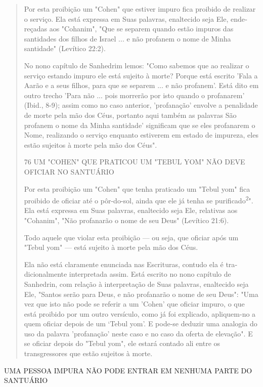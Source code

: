 \begin{quote}
Por esta proibição um "Cohen" que estiver impuro fica proibido de
realizar o serviço. Ela está expressa em Suas palavras, enaltecido seja
Ele, ende­reçadas aos "Cohanim", "Que se separem quando estão impuros
das santida­des dos filhos de Israel ... e não profanem o nome de Minha
santidade" (Levíti­co 22:2).

No nono capítulo de Sanhedrim lemos: "Como sabemos que ao rea­lizar o
serviço estando impuro ele está sujeito à morte? Porque está escrito
'Fa­la a Aarão e a seus filhos, para que se separem ... e não profanem'.
Está dito em outro trecho 'Para não ... pois morrerão por isto quando o
profanarem' (Ibid., 8-9); assim como no caso anterior, 'profanação'
envolve a penalidade de morte pela mão dos Céus, portanto aqui também as
palavras São profanem o nome da Minha santidade' significam que se eles
profanarem o Nome, realizando o serviço enquanto estiverem em estado de
impureza, eles estão sujeitos à morte pela mão dos Céus".

76 UM "COHEN" QUE PRATICOU UM "TEBUL YOM" NÃO DEVE OFICIAR NO SANTUÁRIO

Por esta proibição um "Cohen" que tenha praticado um "Tebul yom" fica
proibido de oficiar até o pôr-do-sol, ainda que ele já tenha se
purificado\textsuperscript{2}". Ela está expressa em Suas palavras,
enaltecido seja Ele, relativas aos "Cohanim", "Não profanarão o nome de
seu Deus" (Levítico 21:6).

Todo aquele que violar esta proibição --- ou seja, que oficiar após um
"Tebul yom" --- está sujeito à morte pela mão dos Céus.

Ela não está claramente enunciada nas Escrituras, contudo ela é
tra­dicionalmente interpretada assim. Está escrito no nono capítulo de
Sanhedrin, com relação à interpretação de Suas palavras, enaltecido seja
Ele, "Santos serão
para Deus, e não profanarão o nome de seu Deus": "Uma vez que isto não
po­de se referir a um 'Cohen' que oficiar impuro, o que está proibido
por um ou­tro versículo, como já foi explicado, apliquem-no a quem
oficiar depois de um `Tebul yom'. E pode-se deduzir uma analogia do uso
da palavra 'profanação' neste caso e no caso da oferta de elevação". E
se oficiar depois do "Tebul yom", ele estará contado ali entre os
transgressores que estão sujeitos à morte.
\end{quote}

UMA PESSOA IMPURA NÃO PODE ENTRAR EM NENHUMA PARTE DO SANTUÁRIO

